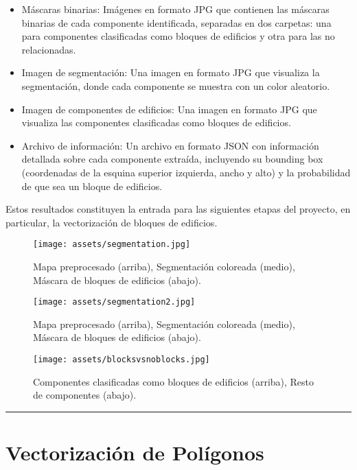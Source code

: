 \documentclass[twocolumn, fontsize=10pt]{article}
\begin{document}
\begin{itemize}
    \item Máscaras binarias: Imágenes en formato JPG que contienen las máscaras binarias de cada componente identificada, separadas en dos carpetas: una para componentes clasificadas como bloques de edificios y otra para las no relacionadas.
    \item Imagen de segmentación: Una imagen en formato JPG que visualiza la segmentación, donde cada componente se muestra con un color aleatorio.
        \item Imagen de componentes de edificios: Una imagen en formato JPG que visualiza las componentes clasificadas como bloques de edificios.
    \item Archivo de información: Un archivo en formato JSON con información detallada sobre cada componente extraída, incluyendo su bounding box (coordenadas de la esquina superior izquierda, ancho y alto) y la probabilidad de que sea un bloque de edificios.
\end{itemize}

Estos resultados constituyen la entrada para las siguientes etapas del proyecto, en particular, la vectorización de bloques de edificios.

\begin{figure}[H]
    \centering
    \texttt{[image: assets/segmentation.jpg]}
    \caption{Mapa preprocesado (arriba), Segmentación coloreada (medio), Máscara de bloques de edificios (abajo).}
    \label{fig:segmentation}
\end{figure}

\begin{figure}[H]
    \centering
    \texttt{[image: assets/segmentation2.jpg]}
    \caption{Mapa preprocesado (arriba), Segmentación coloreada (medio), Máscara de bloques de edificios (abajo).}
    \label{fig:segmentation2}
\end{figure}

\begin{figure}[H]
    \centering
    \texttt{[image: assets/blocksvsnoblocks.jpg]}
    \caption{Componentes clasificadas como bloques de edificios (arriba), Resto de componentes (abajo).}
    \label{fig:blocksvsnoblocks}
\end{figure}


\rule{\linewidth}{0.5pt}
\section{Vectorización de Polígonos}
\end{document}
